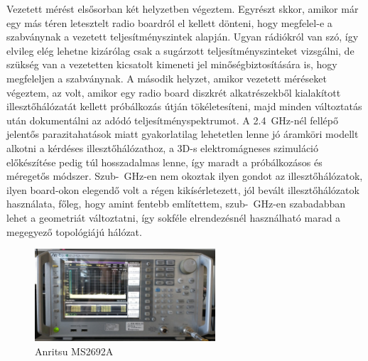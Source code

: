 \documentclass[a4paper,12pt,titlepage]{article}
\begin{document}
            Vezetett mérést elsősorban két helyzetben végeztem. Egyrészt skkor, amikor már egy más téren letesztelt radio boardról el kellett dönteni, hogy megfelel-e a szabványnak a vezetett teljesítményszintek alapján. Ugyan rádiókról van szó, így elvileg elég lehetne kizárólag csak a sugárzott teljesítményszinteket vizsgálni, de szükség van a vezetetten kicsatolt kimeneti jel minőségbiztosítására is, hogy megfeleljen a szabványnak. A második helyzet, amikor vezetett méréseket végeztem, az volt, amikor egy radio board diszkrét alkatrészekből kialakított illesztőhálózatát kellett próbálkozás útján tökéletesíteni, majd minden változtatás után dokumentálni az adódó teljesítményspektrumot. A \SI{2.4}{GHz}-nél fellépő jelentős parazitahatások miatt gyakorlatilag lehetetlen lenne jó áramköri modellt alkotni a kérdéses illesztőhálózathoz, a 3D-s elektromágneses szimuláció előkészítése pedig túl hosszadalmas lenne, így maradt a próbálkozásos és méregetős módszer. Szub-\SI{}{GHz}-en nem okoztak ilyen gondot az illesztőhálózatok, ilyen board-okon elegendő volt a régen kikísérletezett, jól bevált illesztőhálózatok használata, főleg, hogy amint fentebb említettem, szub-\SI{}{GHz}-en szabadabban lehet a geometriát változtatni, így sokféle elrendezésnél használható marad a megegyező topológiájú hálózat.
            \begin{figure}
                \centering
                \includegraphics[width=0.6\textwidth]{kep/szerkesztett/anritsu.jpg}
                \caption{Anritsu MS2692A}
                \label{fig:anritsu}
            \end{figure}
%
\end{document}
